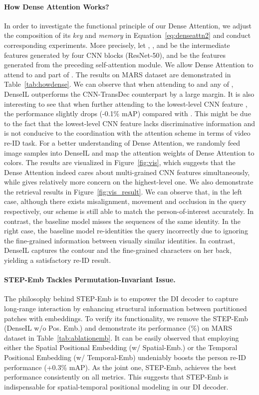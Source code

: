 \documentclass[10pt,twocolumn,letterpaper]{article}
\begin{document}
\paragraph{How Dense Attention Works?}
In order to investigate the functional principle of our Dense Attention, we adjust the composition of its \textit{key} and \textit{memory} in Equation~\eqref{eq:denseattn2} and conduct corresponding experiments. More precisely, let , ,  and  be the intermediate features generated by four CNN blocks (ResNet-50), and  be the features generated from the preceding self-attention module. We allow Dense Attention to attend to  and part of . The results on MARS dataset are demonstrated in Table~\ref{tab:howdense}. We can observe that when attending to  and any of , DenseIL outperforms the CNN-TransDec counterpart by a large margin. It is also interesting to see that when further attending to the lowest-level CNN feature , the performance slightly drops (-0.1\% mAP) compared with . This might be due to the fact that the lowest-level CNN feature lacks discriminative information and is not conducive to the coordination with the attention scheme in terms of video re-ID task. For a better understanding of Dense Attention, we randomly feed image samples into DenseIL and map the attention weights of Dense Attention to colors. The results are visualized in Figure~\ref{fig:vis}, which suggests that the Dense Attention indeed cares about multi-grained CNN features simultaneously, while gives relatively more concern on the highest-level one. We also demonstrate the retrieval results in Figure~\ref{fig:vis_result}. We can observe that, in the left case, although there exists misalignment, movement and occlusion in the query respectively, our scheme is still able to match the person-of-interest accurately. In contrast, the baseline model misses the sequences of the same identity. In the right case, the baseline model re-identities the query incorrectly due to ignoring the fine-grained information between visually similar identities. In contrast, DenseIL captures the contour and the fine-grained characters on her back, yielding a satisfactory re-ID result.


\vspace{-2.5mm}
\paragraph{STEP-Emb Tackles Permutation-Invariant Issue.}
The philosophy behind STEP-Emb is to empower the DI decoder to capture long-range interaction by enhancing structural information between partitioned patches with embeddings. To verify its functionality, we remove the STEP-Emb (DenseIL w/o Pos. Emb.) and demonstrate its performance (\%) on MARS dataset in Table~\ref{tab:ablationemb}. It can be easily observed that employing either the Spatial Positional Embedding (w/ Spatial-Emb.) or the Temporal Positional Embedding (w/ Temporal-Emb) undeniably boosts the person re-ID performance (+0.3\% mAP). As the joint one, STEP-Emb, achieves the best performance consistently on all metrics. This suggests that STEP-Emb is indispensable for spatial-temporal positional modeling in our DI decoder.
\end{document}

